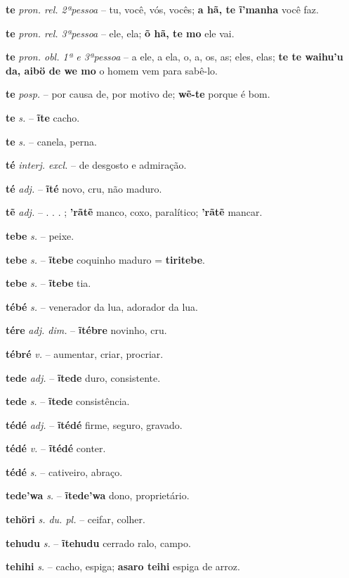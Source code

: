 \textbf{te} \textit{pron. rel. 2ªpessoa} -- tu, você, vós, vocês; \textbf{a hã, te ĩ'manha} você faz.

\textbf{te} \textit{pron. rel. 3ªpessoa} -- ele, ela; \textbf{õ hã, te mo} ele vai.

\textbf{te} \textit{pron. obl. 1ª e 3ªpessoa} -- a ele, a ela, o, a, os, as; eles, elas; \textbf{te te waihu'u da, aibö de we mo} o homem vem para sabê-lo.

\textbf{te} \textit{posp.} -- por causa de, por motivo de; \textbf{wẽ-te} porque é bom.

\textbf{te} \textit{s.} -- \textbf{ĩte} cacho.

\textbf{te} \textit{s.} -- canela, perna.

\textbf{té} \textit{interj. excl.} -- de desgosto e admiração.

\textbf{té} \textit{adj.} -- \textbf{ĩté} novo, cru, não maduro.

\textbf{tẽ} \textit{adj.} -- . . . ; \textbf{'rãtẽ} manco, coxo, paralítico; \textbf{'rãtẽ} mancar.

\textbf{tebe} \textit{s.} -- peixe.

\textbf{tebe} \textit{s.} -- \textbf{ĩtebe} coquinho maduro = \textbf{tiritebe}.

\textbf{tebe} \textit{s.} -- \textbf{ĩtebe} tia.

\textbf{tébé} \textit{s.} -- venerador da lua, adorador da lua.

\textbf{tére} \textit{adj. dim.} -- \textbf{ĩtébre} novinho, cru.

\textbf{tébré} \textit{v.} -- aumentar, criar, procriar.

\textbf{tede} \textit{adj.} -- \textbf{ĩtede} duro, consistente.

\textbf{tede} \textit{s.} -- \textbf{ĩtede} consistência.

\textbf{tédé} \textit{adj.} -- \textbf{ĩtédé} firme, seguro, gravado.

\textbf{tédé} \textit{v.} -- \textbf{ĩtédé} conter.

\textbf{tédé} \textit{s.} -- cativeiro, abraço.

\textbf{tede'wa} \textit{s.} -- \textbf{ĩtede'wa} dono, proprietário.

\textbf{tehöri} \textit{s. du. pl.} -- ceifar, colher.

\textbf{tehudu} \textit{s.} -- \textbf{ĩtehudu} cerrado ralo, campo.

\textbf{tehihi} \textit{s.} -- cacho, espiga; \textbf{asaro teihi} espiga de arroz.

